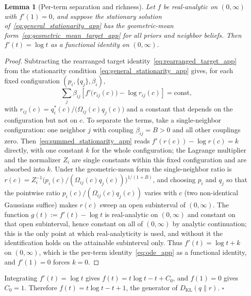 \documentclass[11pt]{article}
\newtheorem{lemma}{Lemma}
\begin{document}
\begin{lemma}[Per-term separation and richness]
\label{lem:richness_app}
Let $f$ be real-analytic on $(0, \infty)$ with $f'(1) = 0$, and suppose the stationary solution of~\eqref{eq:general_stationarity_app} has the geometric-mean form~\eqref{eq:geometric_mean_target_app} for all priors and neighbor beliefs. Then $f'(t) = \log t$ as a functional identity on $(0, \infty)$.
\end{lemma}

\begin{proof}
Subtracting the rearranged target identity~\eqref{eq:rearranged_target_app} from the stationarity condition~\eqref{eq:general_stationarity_app} gives, for each fixed configuration $(p_i, \{q_j\}, \beta_i)$,
\begin{equation}
\sum_j \beta_{ij}\left[f'\big(r_{ij}(c)\big) - \log r_{ij}(c)\right] = \text{const},
\label{eq:summed_stationarity_app}
\end{equation}
with $r_{ij}(c) = q_i^*(c)/\big(\Omega_{ij}(c)q_j(c)\big)$ and a constant that depends on the configuration but not on $c$. To separate the terms, take a single-neighbor configuration: one neighbor $j$ with coupling $\beta_{ij} = B > 0$ and all other couplings zero. Then~\eqref{eq:summed_stationarity_app} reads $f'(r(c)) - \log r(c) = k$ directly, with one constant $k$ for the whole configuration; the Lagrange multiplier and the normalizer $Z_i$ are single constants within this fixed configuration and are absorbed into $k$. Under the geometric-mean form the single-neighbor ratio is $r(c) = Z_i^{-1}\big(p_i(c)/(\Omega_{ij}(c)q_j(c))\big)^{1/(1+B)}$, and choosing $p_i$ and $q_j$ so that the pointwise ratio $p_i(c)/(\Omega_{ij}(c)q_j(c))$ varies with $c$ (two non-identical Gaussians suffice) makes $r(c)$ sweep an open subinterval of $(0, \infty)$. The function $g(t) := f'(t) - \log t$ is real-analytic on $(0, \infty)$ and constant on that open subinterval, hence constant on all of $(0, \infty)$ by analytic continuation; this is the only point at which real-analyticity is used, and without it the identification holds on the attainable subinterval only. Thus $f'(t) = \log t + k$ on $(0, \infty)$, which is the per-term identity~\eqref{eq:ode_app} as a functional identity, and $f'(1) = 0$ forces $k = 0$.
\end{proof}

Integrating $f'(t) = \log t$ gives $f(t) = t\log t - t + C_0$, and $f(1)=0$ gives $C_0 = 1$. Therefore $f(t) = t\log t - t + 1$, the generator of $D_{\mathrm{KL}}(q\|r)$. \hfill $\square$
\end{document}
